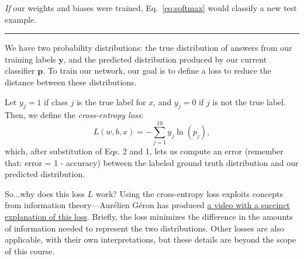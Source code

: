 \emph{If} our weights and biases were trained, Eq.~\ref{eq:softmax} would classify a new test example.

\hspace{\fill}\rule{0.5\linewidth}{.5pt}\hspace{\fill}

We have two probability distributions: the true distribution of answers from our training labels $\mathbf{y}$, and the predicted distribution produced by our current classifier $\mathbf{p}$. To train our network, our goal is to define a loss to reduce the distance between these distributions.

Let $y_j=1$ if class $j$ is the true label for $x$, and $y_j = 0$ if $j$ is not the true label. Then, we define the \emph{cross-entropy loss}:
\begin{equation}
    L(w,b,x) = - \sum_{j=1}^{10}y_j\ln(p_j),
\end{equation}
which, after substitution of Eqs. 2 and 1, lets us compute an error (remember that: error = 1 - accuracy) between the labeled ground truth distribution and our predicted distribution.

So...why does this loss $L$ work? Using the cross-entropy loss exploits concepts from information theory---Aur\'{e}lien G\'{e}ron has produced \href{https://www.youtube.com/watch?v=ErfnhcEV1O8}{a video with a succinct explanation of this loss}. Briefly, the loss minimizes the difference in the amounts of information needed to represent the two distributions. Other losses are also applicable, with their own interpretations, but these details are beyond the scope of this course.

